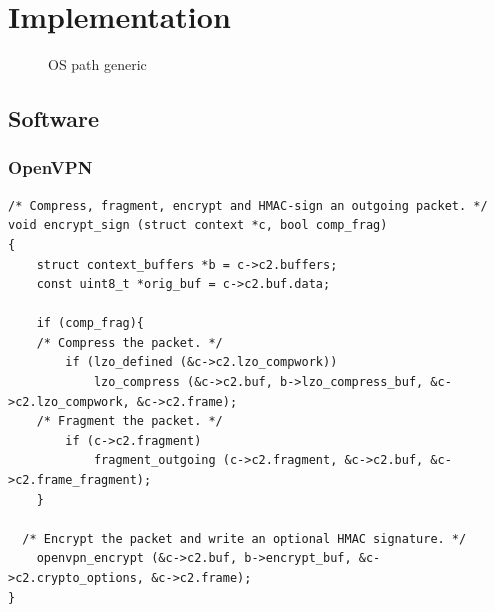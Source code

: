 \chapter{Implementation}

\begin{figure}[ht]
\center
{}
\caption{OS path generic}{}
\label{fig:os-path-generic}
\end{figure}

\section{Software}

\subsection{OpenVPN}

\lstset{language=c}
\begin{lstlisting}[caption=openvpn compress then encrypt -- sample from \texttt{forward.c}, label=list:openvpn-workflow]
/* Compress, fragment, encrypt and HMAC-sign an outgoing packet. */
void encrypt_sign (struct context *c, bool comp_frag)
{
	struct context_buffers *b = c->c2.buffers;
	const uint8_t *orig_buf = c->c2.buf.data;

	if (comp_frag){
	/* Compress the packet. */
		if (lzo_defined (&c->c2.lzo_compwork))
			lzo_compress (&c->c2.buf, b->lzo_compress_buf, &c->c2.lzo_compwork, &c->c2.frame);
	/* Fragment the packet. */
		if (c->c2.fragment)
			fragment_outgoing (c->c2.fragment, &c->c2.buf, &c->c2.frame_fragment);
	}

  /* Encrypt the packet and write an optional HMAC signature. */
	openvpn_encrypt (&c->c2.buf, b->encrypt_buf, &c->c2.crypto_options, &c->c2.frame);
}
\end{lstlisting}

